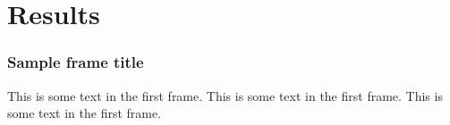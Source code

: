 \section{Results}

\begin{frame}
	\frametitle{Sample frame title}
	This is some text in the first frame. This is some text in the first frame.
	This is some text in the first frame.
\end{frame}
